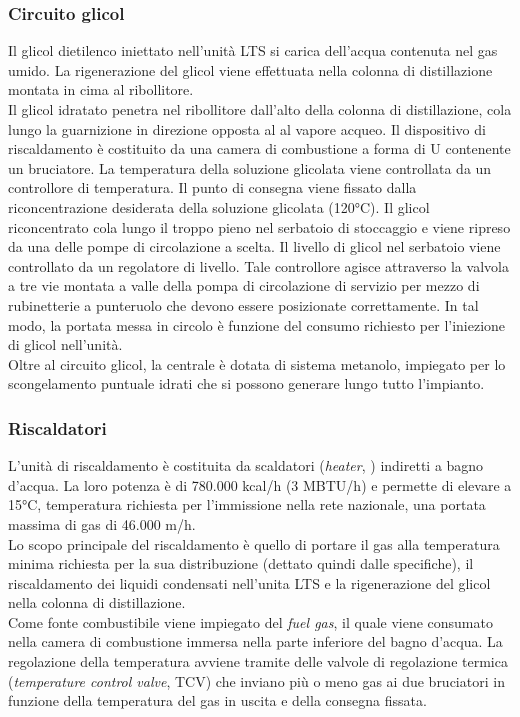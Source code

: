 \subsubsection*{Circuito glicol}
Il glicol dietilenco iniettato nell'unità LTS si carica dell'acqua contenuta nel gas umido. La rigenerazione del glicol viene effettuata nella colonna di distillazione montata in cima al ribollitore.\\
Il glicol idratato penetra nel ribollitore dall'alto della colonna di distillazione, cola lungo la guarnizione in direzione opposta al al vapore acqueo. Il dispositivo di riscaldamento è costituito da una camera di combustione a forma di U contenente un bruciatore. La temperatura della soluzione glicolata viene controllata da un controllore di temperatura. Il punto di consegna viene fissato dalla riconcentrazione desiderata della soluzione glicolata (120°C). Il glicol riconcentrato cola lungo il troppo pieno nel serbatoio di stoccaggio e viene ripreso da una delle pompe di circolazione a scelta. Il livello di glicol nel serbatoio viene controllato da un regolatore di livello. Tale controllore agisce attraverso la valvola a tre vie montata a valle della pompa di circolazione di servizio per mezzo di rubinetterie a punteruolo che devono essere posizionate correttamente. In tal modo, la portata messa in circolo è funzione del consumo richiesto per l'iniezione di glicol nell'unità.\\
Oltre al circuito glicol, la centrale è dotata di sistema metanolo, impiegato per lo scongelamento puntuale idrati che si possono generare lungo tutto l'impianto.

\subsubsection*{Riscaldatori}
L'unità di riscaldamento è costituita da scaldatori (\textit{heater}, ) indiretti a bagno d'acqua. La loro potenza è di 780.000 kcal/h (3 MBTU/h) e permette di elevare a 15°C, temperatura richiesta per l'immissione nella rete nazionale, una portata massima di gas di 46.000 m/h.\\
Lo scopo principale del riscaldamento è quello di portare il gas alla temperatura minima richiesta per la sua distribuzione (dettato quindi dalle specifiche), il riscaldamento dei liquidi condensati nell'unita LTS e la rigenerazione del glicol nella colonna di distillazione.\\
Come fonte combustibile viene impiegato del \textit{fuel gas}, il quale viene consumato nella camera di combustione immersa nella parte inferiore del bagno d'acqua. La regolazione della temperatura avviene tramite delle valvole di regolazione termica (\textit{temperature control valve}, TCV) che inviano più o meno gas ai due bruciatori in funzione della temperatura del gas in uscita e della consegna fissata.

